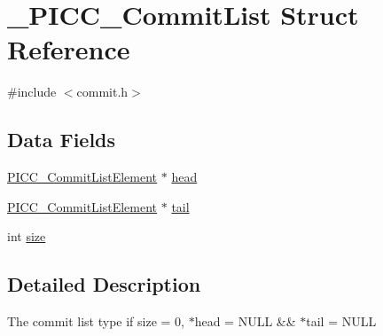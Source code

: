 \hypertarget{struct__PICC__CommitList}{\section{\-\_\-\-P\-I\-C\-C\-\_\-\-Commit\-List Struct Reference}
\label{struct__PICC__CommitList}
}


{\ttfamily \#include $<$commit.\-h$>$}

\subsection*{Data Fields}
{\bf }\par
\begin{DoxyCompactItemize}
\item 
\hyperlink{commit_8h_ab8090c3a82dc75b4dea9bb9015a95f71}{P\-I\-C\-C\-\_\-\-Commit\-List\-Element} $\ast$ \hyperlink{struct__PICC__CommitList_a1e6220d188b828adf2e1833e638196b3}{head}
\item 
\hyperlink{commit_8h_ab8090c3a82dc75b4dea9bb9015a95f71}{P\-I\-C\-C\-\_\-\-Commit\-List\-Element} $\ast$ \hyperlink{struct__PICC__CommitList_ace35f17402f08d1ea9e8fa45c6f7f562}{tail}
\item 
int \hyperlink{struct__PICC__CommitList_a5eb47c6882e4462d638224d54686f7e0}{size}
\end{DoxyCompactItemize}



\subsection{Detailed Description}
The commit list type  if size = 0, $\ast$head = N\-U\-L\-L \&\& $\ast$tail = N\-U\-L\-L  

